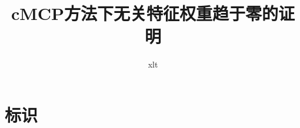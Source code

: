 \documentclass{article}
\title{cMCP方法下无关特征权重趋于零的证明}
\author{xlt}
\begin{document}
\maketitle





\section{标识}





\end{document}
